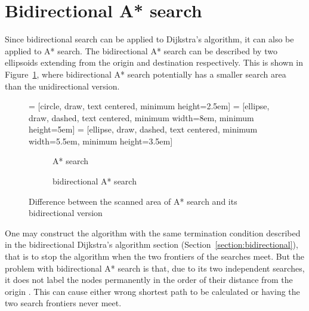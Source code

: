\section{Bidirectional A* search}
Since bidirectional search can be applied to Dijkstra's algorithm,
it can also be applied to A* search.
The bidirectional A* search can be described by two ellipsoids extending from the origin and destination respectively.
This is shown in Figure~\ref{fig:bidirectdiff},
where bidirectional A* search potentially has a smaller search area than the unidirectional version.

\begin{figure}[!ht]
     = [circle, draw, text centered, minimum height=2.5em]
     = [ellipse, draw, dashed, text centered, minimum width=8em, minimum height=5em]
     = [ellipse, draw, dashed, text centered, minimum width=5.5em, minimum height=3.5em]
    \centering
    \begin{subfigure}[t]{.4\textwidth}
        \centering
        \caption{A* search}
    \end{subfigure}
    \begin{subfigure}[t]{.4\textwidth}
        \centering
        \caption{bidirectional A* search}
    \end{subfigure}
    \caption{Difference between the scanned area of A* search and its bidirectional version}
    \label{fig:bidirectdiff}
\end{figure}

One may construct the algorithm with the same termination condition described in the bidirectional Dijkstra's algorithm section (Section~\ref{section:bidirectional}),
that is to stop the algorithm when the two frontiers of the searches meet.
But the problem with bidirectional A* search is that, due to its two independent searches,
it does not label the nodes permanently in the order of their distance from the origin \citep{Klunder}.
This can cause either wrong shortest path to be calculated or having the two search frontiers never meet.

